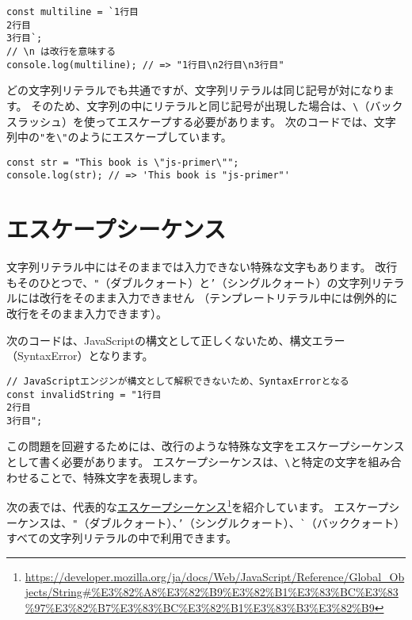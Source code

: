 \enlargethispage{\baselineskip}\begin{lstlisting}
const multiline = `1行目
2行目
3行目`;
// \n は改行を意味する
console.log(multiline); // => "1行目\n2行目\n3行目"
\end{lstlisting}

どの文字列リテラルでも共通ですが、文字列リテラルは同じ記号が対になります。
そのため、文字列の中にリテラルと同じ記号が出現した場合は、\texttt{\textbackslash}\index{\\@\texttt{\textbackslash}}（バックスラッシュ）を使ってエスケープする必要があります。
次のコードでは、文字列中の\texttt{"}を\texttt{\textbackslash"}のようにエスケープしています。

\begin{lstlisting}
const str = "This book is \"js-primer\"";
console.log(str); // => 'This book is "js-primer"'
\end{lstlisting}

\hypertarget{escape-sequence}{%
\section{エスケープシーケンス}\label{escape-sequence}}

文字列リテラル中にはそのままでは入力できない特殊な文字もあります。
改行もそのひとつで、\linebreak \texttt{"}（ダブルクォート）と\texttt{'}（シングルクォート）の文字列リテラルには改行をそのまま入力できません
（テンプレートリテラル中には例外的に改行をそのまま入力できます）。

次のコードは、JavaScriptの構文として正しくないため、構文エラー（SyntaxError）となります。

\begin{lstlisting}
// JavaScriptエンジンが構文として解釈できないため、SyntaxErrorとなる
const invalidString = "1行目
2行目
3行目";
\end{lstlisting}

この問題を回避するためには、改行のような特殊な文字をエスケープシーケンスとして書く必要があります。
エスケープシーケンスは、\texttt{\textbackslash}と特定の文字を組み合わせることで、特殊文字を表現します。

次の表では、代表的な\href{https://developer.mozilla.org/ja/docs/Web/JavaScript/Reference/Global_Objects/String\#\%E3\%82\%A8\%E3\%82\%B9\%E3\%82\%B1\%E3\%83\%BC\%E3\%83\%97\%E3\%82\%B7\%E3\%83\%BC\%E3\%82\%B1\%E3\%83\%B3\%E3\%82\%B9}{エスケープシーケンス}\footnote{\url{https://developer.mozilla.org/ja/docs/Web/JavaScript/Reference/Global_Objects/String\#\%E3\%82\%A8\%E3\%82\%B9\%E3\%82\%B1\%E3\%83\%BC\%E3\%83\%97\%E3\%82\%B7\%E3\%83\%BC\%E3\%82\%B1\%E3\%83\%B3\%E3\%82\%B9}}を紹介しています。
エスケープシーケンスは、\texttt{"}（ダブルクォート）、\texttt{'}（シングルクォート）、\lstinline{`}（バッククォート）すべての文字列リテラルの中で利用できます。

